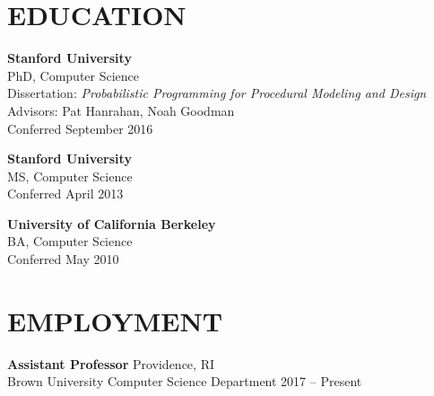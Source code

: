 \documentclass[line,margin]{res}
\begin{document}
\address{ \url{dritchie.github.io} $\cdot$ \url{daniel_ritchie@brown.edu} }
 
\begin{resume}


 
\section{EDUCATION}
\textbf{Stanford University} \\
PhD, Computer Science \\
Dissertation: \emph{Probabilistic Programming for Procedural Modeling and Design} \\
Advisors: Pat Hanrahan, Noah Goodman \\
Conferred September 2016

\textbf{Stanford University} \\
MS, Computer Science \\
Conferred April 2013

\textbf{University of California Berkeley} \\
BA, Computer Science \\
Conferred May 2010


\section{EMPLOYMENT}

\newcommand{\job}[4] {
	\textbf{#1} \hfill #3\\
	#2 \hfill #4
}

\job
{Assistant Professor}
{Brown University Computer Science Department}
{Providence, RI}
{2017 -- Present}


\end{resume}
\end{document}
